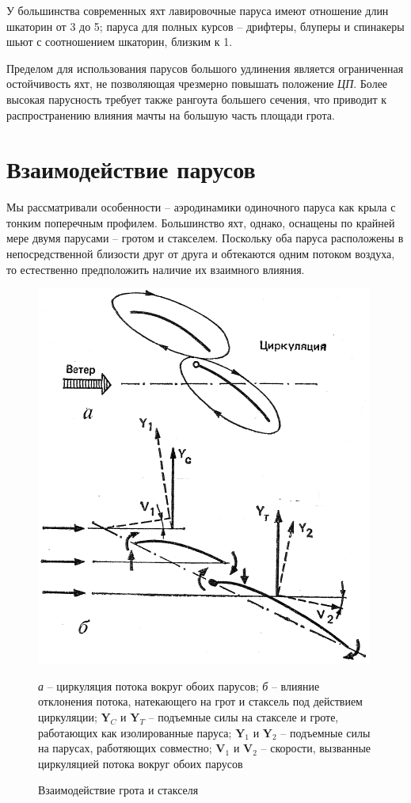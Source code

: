 \documentclass[a4paper, 12pt, twoside, final, book, russian, fittopage, cyremdash]{ncc}
\newcommand{\ve}[1]{\ensuremath{\mathbf{#1}}\xspace}
\begin{document}
У большинства современных яхт лавировочные паруса имеют отношение длин шкаторин от 3 до 5; паруса для полных курсов \--- дрифтеры, блуперы и спинакеры шьют с соотношением шкаторин, близким к 1.

Пределом для использования парусов большого удлинения является ограниченная остойчивость яхт, не позволяющая чрезмерно повышать положение \textit{ЦП}. Более высокая парусность требует также рангоута большего сечения, что приводит к распространению влияния мачты на большую часть площади грота.

\section{Взаимодействие парусов}

Мы рассматривали особенности \--- аэродинамики одиночного паруса как крыла с тонким поперечным профилем. Большинство яхт, однако, оснащены по крайней мере двумя парусами \--- гротом и стакселем. Поскольку оба паруса расположены в непосредственной близости друг от друга и обтекаются одним потоком воздуха, то естественно предположить наличие их взаимного влияния. 

\begin{figure}[htb]
  \centering
  \includegraphics[scale=1.2]{0029P}
  \caption{Взаимодействие грота и стакселя}
  \label{fig:29}
  \small
  \centering{}
  \textit{а} \--- циркуляция потока вокруг обоих парусов; \textit{б} \--- влияние отклонения потока, натекающего на грот и стаксель под действием циркуляции; $\ve Y_C$ и $\ve Y_T$ \--- подъемные силы на стакселе и гроте, работающих как изолированные паруса; $\ve Y_1$ и $\ve Y_2$ \--- подъемные силы на парусах, работяющих совместно; $\ve V_1$ и $\ve V_2$ \--- скорости, вызванные циркуляцией потока вокруг обоих парусов
\end{figure}
\end{document}
